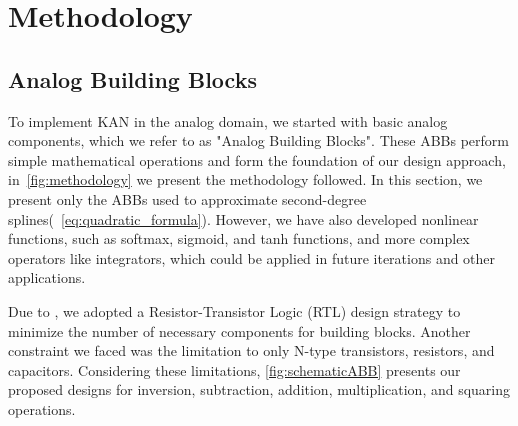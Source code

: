 \section{Methodology}\label{sec:methodology}


\subsection{Analog Building Blocks}



To implement KAN in the analog domain, we started with basic analog components, which we refer to as "Analog Building Blocks". 
These ABBs perform simple mathematical operations and form the foundation of our design approach, in~\autoref{fig:methodology} we present the methodology followed. 
In this section, we present only the ABBs used to approximate second-degree splines(~\autoref{eq:quadratic_formula}). 
However, we have also developed nonlinear functions, such as softmax, sigmoid, and tanh functions, and more complex operators like integrators, which could be applied in future iterations and other applications.

Due to , we adopted a Resistor-Transistor Logic (RTL) design strategy to minimize the number of necessary components for building blocks. 
Another constraint we faced was the limitation to only N-type transistors, resistors, and capacitors. 
Considering these limitations, \autoref{fig:schematicABB} presents our proposed designs for inversion, subtraction, addition, multiplication, and squaring operations.

